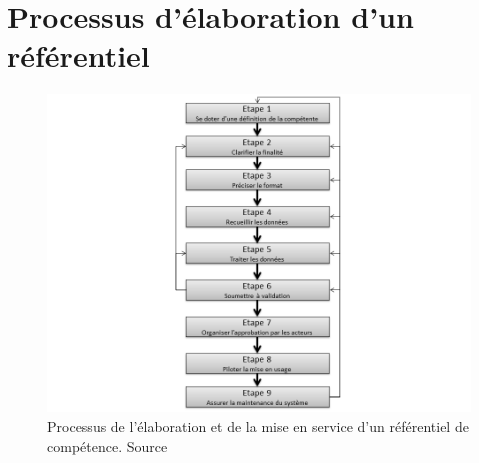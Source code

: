 \chapter{Processus d'élaboration d'un référentiel}

\begin{figure}[h!]
    \begin{center}
        \includegraphics[scale=0.5]{document/process.png}
        \caption{Processus de l'élaboration et de la mise en service d'un référentiel de compétence. Source \citep[pp.41]{refcompetence} }
        \label{process}
    \end{center}
\end{figure}
